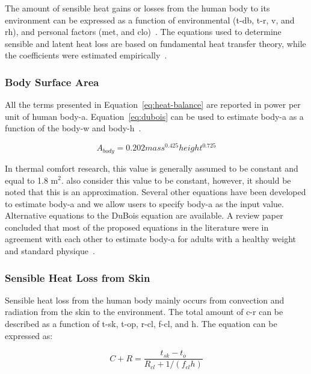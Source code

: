 The amount of sensible heat gains or losses from the human body to its environment can be expressed as a function of environmental (\ac{t-db}, \ac{t-r}, \ac{v}, and \ac{rh}), and personal factors (\ac{met}, and \ac{clo})~\cite{ASHRA2017}.
The equations used to determine sensible and latent heat loss are based on fundamental heat transfer theory, while the coefficients were estimated empirically~\cite{ASHRA2017}.

\subsubsection{Body Surface Area}

All the terms presented in Equation~\ref{eq:heat-balance} are reported in power per unit of human \ac{body-a}.
Equation~\ref{eq:dubois} can be used to estimate \ac{body-a} as a function of the \ac{body-w} and \ac{body-h}~\cite{DuBois}.

\begin{equation}
    A_{body} = 0.202 mass^{0.425} height^{0.725}\label{eq:dubois}
\end{equation}

In thermal comfort research, this value is generally assumed to be constant and equal to 1.8 m$^{2}$.
 also consider this value to be constant, however, it should be noted that this is an approximation.
Several other equations have been developed to estimate \ac{body-a} and we allow users to specify \ac{body-a} as the input value.
Alternative equations to the DuBois equation are available.
A review paper concluded that most of the proposed equations in the literature were in agreement with each other to estimate \ac{body-a} for adults with a healthy weight and standard physique~\cite{Redlarski2016}.

\subsubsection{Sensible Heat Loss from Skin}

Sensible heat loss from the human body mainly occurs from convection and radiation from the skin to the environment.
The total amount of \ac{c-r} can be described as a function of \ac{t-sk}, \ac{t-op}, \ac{r-cl}, \ac{f-cl}, and \ac{h}.
The equation can be expressed as:

\begin{equation}
    C+R=\frac{t_{s k}-t_{o}}{R_{c l}+1 /\left(f_{c l} h\right)}\label{eq:c-r}
\end{equation}

